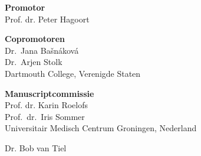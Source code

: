 \newpage
\thispagestyle{empty}

{\setlength{\parindent}{0cm}\raggedright

\newpage

\hspace{-12pt}\textbf{Promotor}\\
Prof. dr. Peter Hagoort
\vspace{12pt}

\hspace{-12pt}\textbf{Copromotoren}\\
Dr.~Jana Ba\v{s}n\'{a}kov\'{a} \\
Dr.~Arjen Stolk \\ 
\vspace{-.1cm}
{\footnotesize Dartmouth College, Verenigde Staten}
\vspace{20pt}

\hspace{-12pt}\textbf{Manuscriptcommissie}\\
Prof. dr. Karin Roelofs\\

\vspace{6pt}
Prof.~dr.~Iris Sommer\\
\vspace{-.1cm}
{\footnotesize Universitair Medisch Centrum Groningen, Nederland}

\vspace{-6pt}
Dr. Bob van Tiel\\


\vfill
}

